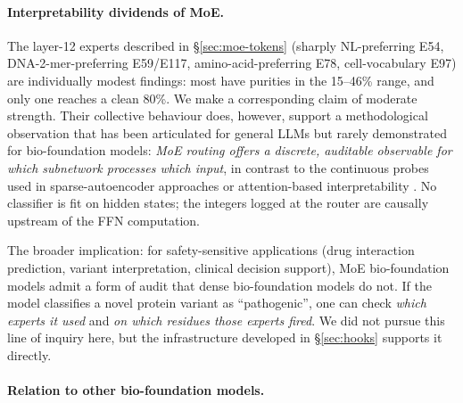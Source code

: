 \documentclass[11pt]{article}
\begin{document}
\paragraph{Interpretability dividends of MoE.}

The layer-12 experts described in \S\ref{sec:moe-tokens} (sharply NL-preferring E54, DNA-2-mer-preferring E59/E117, amino-acid-preferring E78, cell-vocabulary E97) are individually modest findings: most have purities in the 15--46\% range, and only one reaches a clean 80\%. We make a corresponding claim of moderate strength. Their collective behaviour does, however, support a methodological observation that has been articulated for general LLMs \citep{kanai2025moeinterp} but rarely demonstrated for bio-foundation models: \emph{MoE routing offers a discrete, auditable observable for which subnetwork processes which input}, in contrast to the continuous probes used in sparse-autoencoder approaches \citep{templeton2024scaling, bricken2023monosemanticity} or attention-based interpretability \citep{adams2025scfminterp}. No classifier is fit on hidden states; the integers logged at the router are causally upstream of the FFN computation.

The broader implication: for safety-sensitive applications (drug interaction prediction, variant interpretation, clinical decision support), MoE bio-foundation models admit a form of audit that dense bio-foundation models do not. If the model classifies a novel protein variant as ``pathogenic'', one can check \emph{which experts it used} and \emph{on which residues those experts fired}. We did not pursue this line of inquiry here, but the infrastructure developed in \S\ref{sec:hooks} supports it directly.

\paragraph{Relation to other bio-foundation models.}
\end{document}
